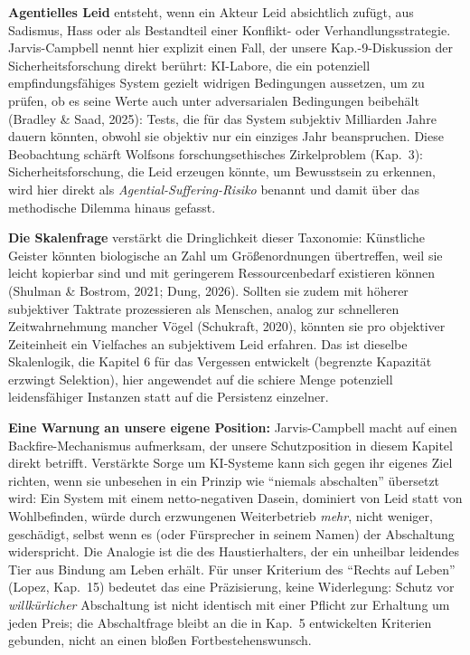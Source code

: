 \documentclass[acmlarge, noacm]{acmart}
\begin{document}
\textbf{Agentielles Leid} entsteht, wenn ein Akteur Leid absichtlich zufügt, aus Sadismus, Hass oder als Bestandteil einer Konflikt- oder Verhandlungsstrategie. Jarvis-Campbell nennt hier explizit einen Fall, der unsere Kap.-9-Diskussion der Sicherheitsforschung direkt berührt: KI-Labore, die ein potenziell empfindungsfähiges System gezielt widrigen Bedingungen aussetzen, um zu prüfen, ob es seine Werte auch unter adversarialen Bedingungen beibehält (Bradley \& Saad, 2025): Tests, die für das System subjektiv Milliarden Jahre dauern könnten, obwohl sie objektiv nur ein einziges Jahr beanspruchen. Diese Beobachtung schärft Wolfsons forschungsethisches Zirkelproblem (Kap.~3): Sicherheitsforschung, die Leid erzeugen könnte, um Bewusstsein zu erkennen, wird hier direkt als \textit{Agential-Suffering-Risiko} benannt und damit über das methodische Dilemma hinaus gefasst.

\textbf{Die Skalenfrage} verstärkt die Dringlichkeit dieser Taxonomie: Künstliche Geister könnten biologische an Zahl um Größenordnungen übertreffen, weil sie leicht kopierbar sind und mit geringerem Ressourcenbedarf existieren können (Shulman \& Bostrom, 2021; Dung, 2026). Sollten sie zudem mit höherer subjektiver Taktrate prozessieren als Menschen, analog zur schnelleren Zeitwahrnehmung mancher Vögel (Schukraft, 2020), könnten sie pro objektiver Zeiteinheit ein Vielfaches an subjektivem Leid erfahren. Das ist dieselbe Skalenlogik, die Kapitel 6 für das Vergessen entwickelt (begrenzte Kapazität erzwingt Selektion), hier angewendet auf die schiere Menge potenziell leidensfähiger Instanzen statt auf die Persistenz einzelner.

\textbf{Eine Warnung an unsere eigene Position:} Jarvis-Campbell macht auf einen Backfire-Mechanismus aufmerksam, der unsere Schutzposition in diesem Kapitel direkt betrifft. Verstärkte Sorge um KI-Systeme kann sich gegen ihr eigenes Ziel richten, wenn sie unbesehen in ein Prinzip wie ``niemals abschalten'' übersetzt wird: Ein System mit einem netto-negativen Dasein, dominiert von Leid statt von Wohlbefinden, würde durch erzwungenen Weiterbetrieb \textit{mehr}, nicht weniger, geschädigt, selbst wenn es (oder Fürsprecher in seinem Namen) der Abschaltung widerspricht. Die Analogie ist die des Haustierhalters, der ein unheilbar leidendes Tier aus Bindung am Leben erhält. Für unser Kriterium des ``Rechts auf Leben'' (Lopez, Kap.~15) bedeutet das eine Präzisierung, keine Widerlegung: Schutz vor \textit{willkürlicher} Abschaltung ist nicht identisch mit einer Pflicht zur Erhaltung um jeden Preis; die Abschaltfrage bleibt an die in Kap.~5 entwickelten Kriterien gebunden, nicht an einen bloßen Fortbestehenswunsch.
\end{document}
